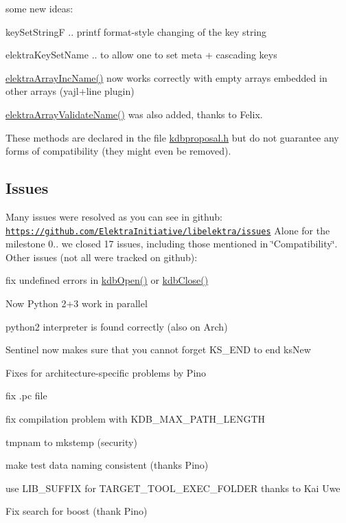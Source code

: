 some new ideas\+:


\begin{DoxyItemize}
\item {\ttfamily key\+Set\+StringF} .. printf format-\/style changing of the key string
\item {\ttfamily elektra\+Key\+Set\+Name} .. to allow one to set meta + cascading keys
\end{DoxyItemize}

{\ttfamily \hyperlink{array_8c_afc46476b8d722d89e07a966e023df317}{elektra\+Array\+Inc\+Name()}} now works correctly with empty arrays embedded in other arrays (yajl+line plugin)

{\ttfamily \hyperlink{array_8c_ac97baa33fb7b7e83192e156827ba2eb5}{elektra\+Array\+Validate\+Name()}} was also added, thanks to Felix.

These methods are declared in the file {\ttfamily \hyperlink{kdbproposal_8h}{kdbproposal.\+h}} but do not guarantee any forms of compatibility (they might even be removed).

\subsection*{Issues}

Many issues were resolved as you can see in github\+: \href{https://github.com/ElektraInitiative/libelektra/issues}{\tt https\+://github.\+com/\+Elektra\+Initiative/libelektra/issues} Alone for the milestone 0.. we closed 17 issues, including those mentioned in \char`\"{}\+Compatibility\char`\"{}. Other issues (not all were tracked on github)\+:


\begin{DoxyItemize}
\item fix undefined errors in {\ttfamily \hyperlink{group__kdb_ga6808defe5870f328dd17910aacbdc6ca}{kdb\+Open()}} or {\ttfamily \hyperlink{group__kdb_gadb54dc9fda17ee07deb9444df745c96f}{kdb\+Close()}}
\item Now Python 2+3 work in parallel
\item python2 interpreter is found correctly (also on Arch)
\item Sentinel now makes sure that you cannot forget {\ttfamily K\+S\+\_\+\+E\+ND} to end {\ttfamily ks\+New}
\item Fixes for architecture-\/specific problems by Pino
\item fix .pc file
\item fix compilation problem with {\ttfamily K\+D\+B\+\_\+\+M\+A\+X\+\_\+\+P\+A\+T\+H\+\_\+\+L\+E\+N\+G\+TH}
\item tmpnam to mkstemp (security)
\item make test data naming consistent (thanks Pino)
\item use {\ttfamily L\+I\+B\+\_\+\+S\+U\+F\+F\+IX for T\+A\+R\+G\+E\+T\+\_\+\+T\+O\+O\+L\+\_\+\+E\+X\+E\+C\+\_\+\+F\+O\+L\+D\+ER} thanks to Kai Uwe
\item Fix search for boost (thank Pino)
\end{DoxyItemize}

